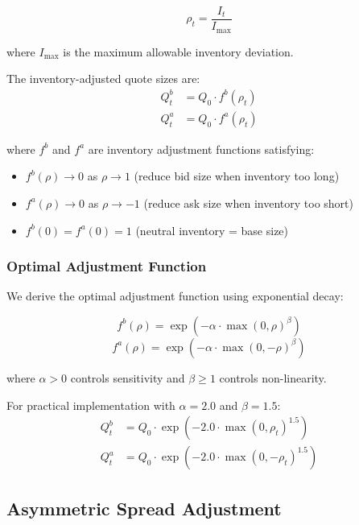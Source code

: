 \documentclass[11pt,a4paper]{article}
\theoremstyle{definition}
\begin{document}
\begin{equation}
\rho_t = \frac{I_t}{I_{\max}}
\end{equation}

where $I_{\max}$ is the maximum allowable inventory deviation.

The inventory-adjusted quote sizes are:
\begin{align}
Q_t^b &= Q_0 \cdot f^b(\rho_t) \\
Q_t^a &= Q_0 \cdot f^a(\rho_t)
\end{align}

where $f^b$ and $f^a$ are inventory adjustment functions satisfying:
\begin{itemize}
    \item $f^b(\rho) \rightarrow 0$ as $\rho \rightarrow 1$ (reduce bid size when inventory too long)
    \item $f^a(\rho) \rightarrow 0$ as $\rho \rightarrow -1$ (reduce ask size when inventory too short)
    \item $f^b(0) = f^a(0) = 1$ (neutral inventory = base size)
\end{itemize}

\subsubsection{Optimal Adjustment Function}

We derive the optimal adjustment function using exponential decay:

\begin{equation}
f^b(\rho) = \exp\left(-\alpha \cdot \max(0, \rho)^\beta\right)
\end{equation}
\begin{equation}
f^a(\rho) = \exp\left(-\alpha \cdot \max(0, -\rho)^\beta\right)
\end{equation}

where $\alpha > 0$ controls sensitivity and $\beta \geq 1$ controls non-linearity.

For practical implementation with $\alpha = 2.0$ and $\beta = 1.5$:
\begin{align}
Q_t^b &= Q_0 \cdot \exp\left(-2.0 \cdot \max(0, \rho_t)^{1.5}\right) \\
Q_t^a &= Q_0 \cdot \exp\left(-2.0 \cdot \max(0, -\rho_t)^{1.5}\right)
\end{align}

\subsection{Asymmetric Spread Adjustment}
\end{document}
